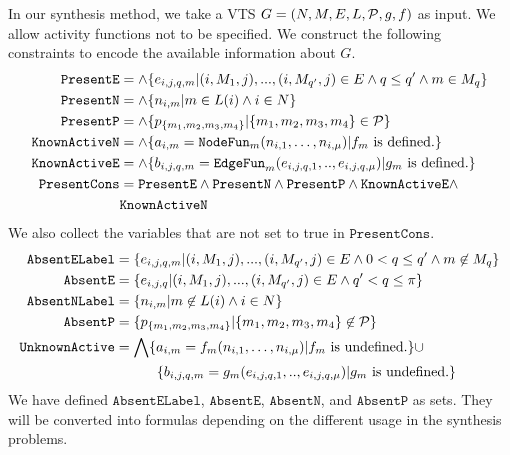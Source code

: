 In our synthesis method, we take a VTS $G =
(N,M,E,L,\mathcal{P},g,f)$ as input.
%
We allow activity functions not to be specified.
%
We construct the following constraints to encode the available information
about $G$.
%
\begin{align*}
  \texttt{PresentE} &= \land \{e_{i,j,q,m}|(i,M_1,j),...,(i,M_{q'},j) \in E \land q \leq q' \land m \in M_q \}\\
  \texttt{PresentN} &= \land \{n_{i,m}| m \in L(i) \land i \in N \}\\
  \texttt{PresentP} &= \land \{p_{\{m_1,m_2,m_3,m_4\}}| \{m_1,m_2,m_3,m_4\} \in \mathcal{P} \} \\
  \texttt{KnownActiveN} &= \land \{ a_{i,m} = \texttt{NodeFun}_m (n_{i,1},\dots,n_{i,\mu}) | f_m \text{ is defined.} \} \\
  \texttt{KnownActiveE} &= \land \{ b_{i,j,q,m} = \texttt{EdgeFun}_m(e_{i,j,q,1}, .., e_{i,j,q,\mu})
                   | g_m \text{ is defined.} \} \\
  \texttt{PresentCons} & = \texttt{PresentE} \land \texttt{PresentN} \land 
  \texttt{PresentP} \land \texttt{KnownActiveE} \land \\
  &  \texttt{KnownActiveN}
\end{align*}
We also collect the variables that are not set to true in $\texttt{PresentCons}$.
\begin{align*}
  \texttt{AbsentELabel} &=
  \{e_{i,j,q,m}|(i,M_1,j),...,(i,M_{q'},j) \in E \land 
                          0 < q \leq q' \land m \not\in M_{q} \}\\
  \texttt{AbsentE} &= \{e_{i,j,q}|(i,M_1,j),...,(i,M_{q'},j) \in E \land 
                    q' < q \leq \pi \}\\
  \texttt{AbsentNLabel} &= \{n_{i,m}| m \not\in L(i) \land i \in N \}\\
  \texttt{AbsentP} &= \{p_{\{m_1,m_2,m_3,m_4\}}| {\{m_1,m_2,m_3,m_4\}} \not\in \mathcal{P} \} \\
  \texttt{UnknownActive} &=  \bigwedge \{ a_{i,m} = f_m (n_{i,1},\dots,n_{i,\mu}) | f_m \text{ is undefined.} \} {\cup} \\
   &\quad\quad\quad  \{ b_{i,j,q,m} = g_m(e_{i,j,q,1}, .., e_{i,j,q,\mu})
                   | g_m \text{ is undefined.} \}
\end{align*}
We have defined $\texttt{AbsentELabel}$, $\texttt{AbsentE}$, $\texttt{AbsentN}$, and
$\texttt{AbsentP}$
as sets.
%
They will be converted into formulas depending
on the different usage in the synthesis problems. 

